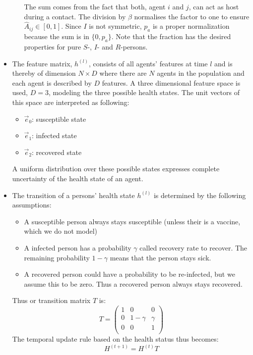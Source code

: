 \documentclass[]{article}
\begin{document}
\begin{itemize}
\begin{itemize}
		The sum comes from the fact that both, agent $i$ and $j$, can act as host during a contact. The division by $\beta$ normalises the factor to one to ensure $\hat{A}_{ij} \in [0, 1]$. Since $I$ is not symmetric, $p_a$ is a proper normalization because the sum is in $\{0, p_a\}$. Note that the fraction has the desired properties for pure $S$-, $I$- and $R$-persons.
	\end{itemize}
	\item The feature matrix, $h^{(l)}$, consists of all agents' features at time $l$ and is thereby of dimension $N\times D$ where there are $N$ agents in the population and each agent is described by $D$ features. A three dimensional feature space is used, $D=3$, modeling the three possible health states. The unit vectors of this space are interpreted as following:
	\begin{itemize}
		\item $\vec{e}_0$: susceptible state
		\item $\vec{e}_1$: infected state
		\item $\vec{e}_2$: recovered state
	\end{itemize}
	A uniform distribution over these possible states expresses complete uncertainty of the health state of an agent.
	\item The transition of a persons' health state $h^{(l)}$ is determined by the following assumptions:
	\begin{itemize}
		\item A susceptible person always stays susceptible (unless their is a vaccine, which we do not model)
		\item A infected person has a probability $\gamma$ called recovery rate to recover. The remaining probability $1-\gamma$ means that the person stays sick.
		\item A recovered person could have a probability to be re-infected, but we assume this to be zero. Thus a recovered person always stays recovered.
	\end{itemize}
	Thus or transition matrix $T$ is:
	\begin{equation}
		T = 
		\begin{pmatrix}
			1 &     0    & 0      \\
			0 & 1-\gamma & \gamma \\
			0 &     0    & 1      \\
		\end{pmatrix}
	\end{equation}
	The temporal update rule based on the health status thus becomes:
	\begin{equation}
		H^{(t+1)} = H^{(t)} T
	\end{equation}
\end{itemize}
\end{document}
